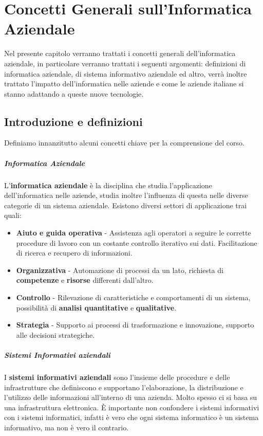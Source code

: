 \chapter[Concetti Generali]{Concetti Generali sull'Informatica Aziendale}
\thispagestyle{chapterInit}
Nel presente capitolo verranno trattati i concetti generali dell'informatica aziendale, in particolare verranno trattati i seguenti argomenti: definizioni di informatica aziendale, di sistema informativo aziendale ed altro, verrà inoltre trattato l'impatto dell'informatica nelle aziende e come le aziende italiane si stanno adattando a queste nuove tecnologie.

\section{Introduzione e definizioni}
    Definiamo innanzitutto alcuni concetti chiave per la comprensione del corso.
    \paragraph{Informatica Aziendale} L'\textbf{informatica aziendale} è la disciplina che studia l'applicazione dell'informatica nelle aziende, studia inoltre l'influenza di questa nelle diverse categorie di un sistema aziendale. Esistono diversi settori di applicazione trai quali:
        \begin{itemize}
            \item \textbf{Aiuto e guida operativa} - Assistenza agli operatori a seguire le corrette procedure di lavoro con un costante controllo iterativo sui dati. Facilitazione di ricerca e recupero di informazioni.
            \item \textbf{Organizzativa} - Automazione di processi da un lato, richiesta di \textbf{competenze} e \textbf{risorse} differenti dall'altro.
            \item \textbf{Controllo} - Rilevazione di caratteristiche e comportamenti di un sistema, possibilità di \textbf{analisi quantitative} e \textbf{qualitative}.
            \item \textbf{Strategia} - Supporto ai processi di trasformazione e innovazione, supporto alle decisioni strategiche. 
        \end{itemize}
    \paragraph{Sistemi Informativi aziendali} I \textbf{sistemi informativi aziendali} sono l'insieme delle procedure e delle infrastrutture che definiscono e supportano l'elaborazione, la distribuzione e l'utilizzo delle informazioni all'interno di una azienda. Molto spesso ci si basa su una infrastruttura elettronica. È importante non confondere i sistemi informativi con i sistemi informatici, infatti è vero che ogni sistema informatico è un sistema informativo, ma non è vero il contrario.
